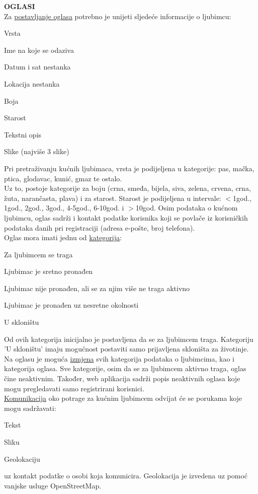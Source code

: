 		
		\textbf{OGLASI}\\
		Za \underline{postavljanje oglasa} potrebno je unijeti sljedeće informacije o ljubimcu:
		\begin{packed_item}
			\item Vrsta
			\item Ime na koje se odaziva
			\item Datum i sat nestanka
			\item Lokacija nestanka
			\item Boja
			\item Starost
			\item Tekstni opis
			\item Slike (najviše 3 slike)
		\end{packed_item}
		Pri pretraživanju kućnih ljubimaca, vrsta je podijeljena u kategorije: pas, mačka, ptica, glodavac, kunić, gmaz te ostalo.\\
		Uz to, postoje kategorije za boju (crna, smeđa, bijela, siva, zelena, crvena, crna, žuta, narančasta, plava) i za starost. Starost je podijeljena u intervale: $<$1god., 1god., 2god., 3god., 4-5god., 6-10god. i $>$10god.
		Osim podataka o kućnom ljubimcu, oglas sadrži i kontakt podatke korisnika koji se povlače iz korisničkih podataka danih pri registraciji (adresa e-pošte, broj telefona).\\
		Oglas mora imati jednu od \underline{kategorija}:
		\begin{packed_item}
			\item Za ljubimcem se traga
			\item Ljubimac je sretno pronađen
			\item Ljubimac nije pronađen, ali se za njim više ne traga aktivno
			\item Ljubimac je pronađen uz nesretne okolnosti
			\item U skloništu 
		\end{packed_item}
		Od ovih kategorija inicijalno je postavljena da se za ljubimcem traga. Kategoriju 'U skloništu' imaju mogućnost postaviti samo prijavljena skloništa za životinje. Na oglasu je moguća
		 \underline{izmjena} svih kategorija podataka o ljubimcima, kao i kategorija oglasa. Sve kategorije, osim da se za ljubimcem aktivno traga, oglas čine neaktivnim. Također, web aplikacija sadrži popis neaktivnih oglasa koje mogu pregledavati samo registrirani korisnici.\\
		\underline{Komunikacija} oko potrage za kućnim ljubimcem odvijat će se porukama koje mogu sadržavati:
		\begin{packed_item}
			\item Tekst
			\item Sliku
			\item Geolokaciju
		\end{packed_item}
		uz kontakt podatke o osobi koja komunicira. Geolokacija je izvedena uz pomoć vanjske usluge OpenStreetMap.\\
		
